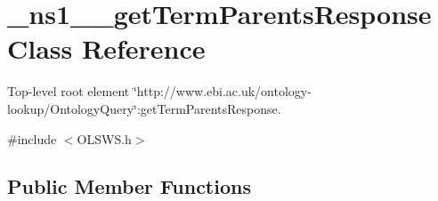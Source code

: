\hypertarget{class__ns1____getTermParentsResponse}{
\section{\_\-ns1\_\-\_\-getTermParentsResponse Class Reference}
\label{class__ns1____getTermParentsResponse}
}


Top-\/level root element \char`\"{}http://www.ebi.ac.uk/ontology-\/lookup/OntologyQuery\char`\"{}:getTermParentsResponse.  




{\ttfamily \#include $<$OLSWS.h$>$}

\subsection*{Public Member Functions}
